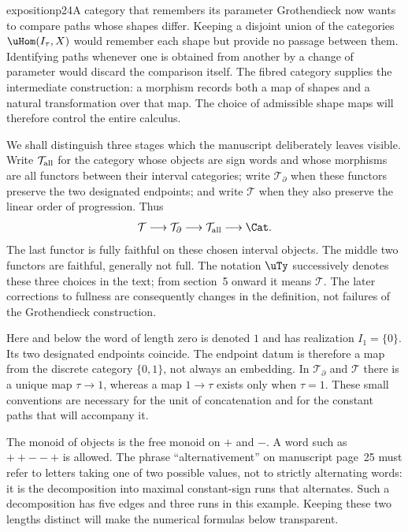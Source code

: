 \begin{dcomment}{exposition}{p24}{A category that remembers its parameter}
Grothendieck now wants to compare paths whose shapes differ. Keeping a disjoint union of the categories $\uHom(I_\tau,X)$ would remember each shape but provide no passage between them. Identifying paths whenever one is obtained from another by a change of parameter would discard the comparison itself. The fibred category supplies the intermediate construction: a morphism records both a map of shapes and a natural transformation over that map. The choice of admissible shape maps will therefore control the entire calculus.

We shall distinguish three stages which the manuscript deliberately leaves visible. Write $\mathcal T_{\rm all}$ for the category whose objects are sign words and whose morphisms are all functors between their interval categories; write $\mathcal T_{\partial}$ when these functors preserve the two designated endpoints; and write $\mathcal T$ when they also preserve the linear order of progression. Thus
\[
 \mathcal T\longrightarrow\mathcal T_{\partial}
 \longrightarrow\mathcal T_{\rm all}\longrightarrow\Cat.
\]
The last functor is fully faithful on these chosen interval objects. The middle two functors are faithful, generally not full. The notation $\uTy$ successively denotes these three choices in the text; from section~5 onward it means $\mathcal T$. The later corrections to fullness are consequently changes in the definition, not failures of the Grothendieck construction.

Here and below the word of length zero is denoted $1$ and has realization $I_1=\{0\}$. Its two designated endpoints coincide. The endpoint datum is therefore a map from the discrete category $\{0,1\}$, not always an embedding. In $\mathcal T_{\partial}$ and $\mathcal T$ there is a unique map $\tau\to1$, whereas a map $1\to\tau$ exists only when $\tau=1$. These small conventions are necessary for the unit of concatenation and for the constant paths that will accompany it.

The monoid of objects is the free monoid on $+$ and $-$. A word such as $++--+$ is allowed. The phrase ``alternativement'' on manuscript page~25 must refer to letters taking one of two possible values, not to strictly alternating words: it is the decomposition into maximal constant-sign runs that alternates. Such a decomposition has five edges and three runs in this example. Keeping these two lengths distinct will make the numerical formulas below transparent.
\end{dcomment}

